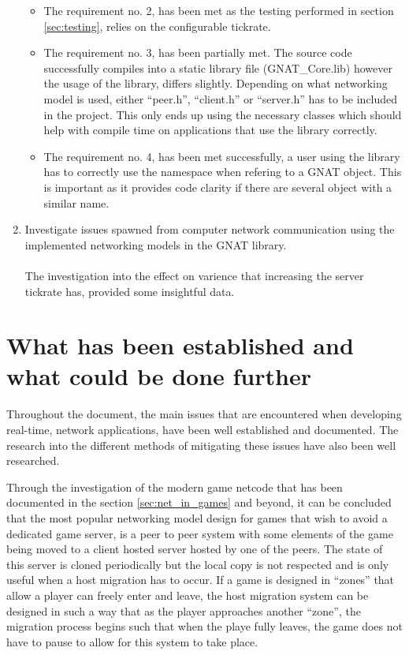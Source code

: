 \begin{enumerate}
\begin{itemize}
\item The requirement no. 2, has been met as the testing performed in section \ref{sec:testing}, relies on the configurable tickrate.

\item The requirement no. 3, has been partially met. The source code successfully compiles into a static library file (GNAT\_Core.lib) however the usage of the library, differs slightly. Depending on what networking model is used, either ``peer.h'', ``client.h'' or ``server.h'' has to be included in the project. This only ends up using the necessary classes which should help with compile time on applications that use the library correctly.

\item The requirement no. 4, has been met successfully, a user using the library has to correctly use the namespace when refering to a GNAT object. This is important as it provides code clarity if there are several object with a similar name.
\end{itemize}


\item Investigate issues spawned from computer network communication using the implemented networking models in the GNAT library.
  \\\\
  The investigation into the effect on varience that increasing the server tickrate has, provided some insightful data.
\end{enumerate}


\section{What has been established and what could be done further}
Throughout the document, the main issues that are encountered when developing real-time, network applications, have been well established and documented. The research into the different methods of mitigating these issues have also been well researched.

Through the investigation of the modern game netcode that has been documented in the section \ref{sec:net_in_games} and beyond, it can be concluded that the most popular networking model design for games that wish to avoid a dedicated game server, is a peer to peer system with some elements of the game being moved to a client hosted server hosted by one of the peers. The state of this server is cloned periodically but the local copy is not respected and is only useful when a host migration has to occur. If a game is designed in ``zones'' that allow a player can freely enter and leave, the host migration system can be designed in such a way that as the player approaches another ``zone'', the migration process begins such that when the playe fully leaves, the game does not have to pause to allow for this system to take place.


